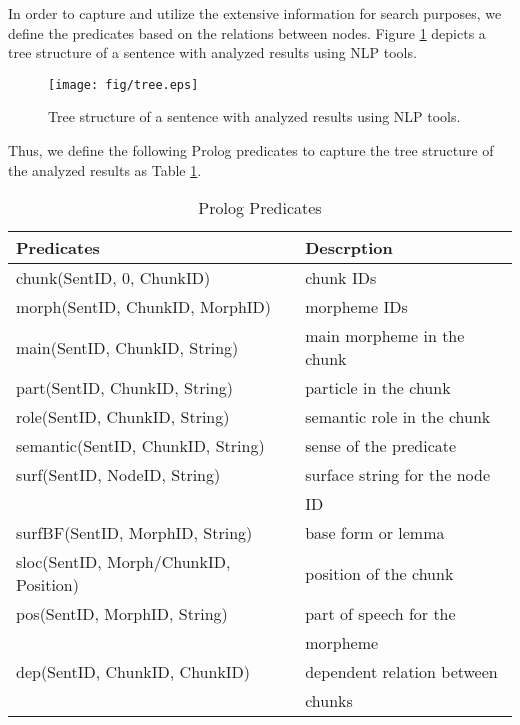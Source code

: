 \documentclass[conference]{IEEEtran}
\begin{document}
In order to capture and utilize the extensive information for search purposes,
we define the predicates
based on the relations between nodes. Figure \ref{fig:tree} depicts a tree structure of
a sentence with analyzed results using NLP tools.

\begin{figure}[htbp]
  \centerline{\texttt{[image: fig/tree.eps]}}
  \caption{Tree structure of a sentence with analyzed results using NLP tools.}
  \label{fig:tree}
\end{figure}

Thus, we define the following Prolog predicates to capture the tree structure of
the analyzed results as Table \ref{tbl:predicates}.

\begin{table}[htbp]
  \caption{Prolog Predicates}
  \begin{center}
    \begin{tabular}{|l|l|}\hline
      Predicates                            & Descrption                  \\\hline
      chunk(SentID, 0, ChunkID)             & chunk IDs                   \\
      morph(SentID, ChunkID, MorphID)       & morpheme IDs                \\
      main(SentID, ChunkID, String)         & main morpheme in the chunk  \\
      part(SentID, ChunkID, String)         & particle in the chunk       \\
      role(SentID, ChunkID, String)         & semantic role in the chunk  \\
      semantic(SentID, ChunkID, String)     & sense of the predicate      \\
      surf(SentID, NodeID, String)          & surface string for the node \\
                                            & ID                          \\
      surfBF(SentID, MorphID, String)       & base form or lemma          \\
      sloc(SentID, Morph/ChunkID, Position) & position of the chunk       \\
      pos(SentID, MorphID, String)          & part of speech for the      \\
                                            & morpheme                    \\
      dep(SentID, ChunkID, ChunkID)         & dependent relation between  \\
                                            & chunks                      \\\hline
    \end{tabular}
    \label{tbl:predicates}
  \end{center}
\end{table}
\end{document}
